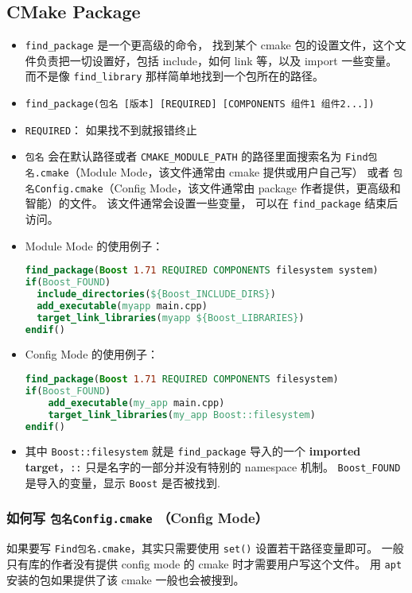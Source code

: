 \subsection{CMake Package}
\begin{itemize}
\item \verb`find_package` 是一个更高级的命令， 找到某个 cmake 包的设置文件，这个文件负责把一切设置好，包括 include，如何 link 等，以及 import 一些变量。 而不是像 \verb`find_library` 那样简单地找到一个包所在的路径。
\item \verb`find_package(包名 [版本] [REQUIRED] [COMPONENTS 组件1 组件2...])`
\item \verb`REQUIRED`： 如果找不到就报错终止
\item \verb`包名` 会在默认路径或者 \verb`CMAKE_MODULE_PATH` 的路径里面搜索名为 \verb`Find包名.cmake`（Module Mode，该文件通常由 cmake 提供或用户自己写） 或者 \verb`包名Config.cmake`（Config Mode，该文件通常由 package 作者提供，更高级和智能）的文件。 该文件通常会设置一些变量， 可以在 \verb`find_package` 结束后访问。
\item Module Mode 的使用例子：
\begin{lstlisting}[language=cmake]
find_package(Boost 1.71 REQUIRED COMPONENTS filesystem system)
if(Boost_FOUND)
  include_directories(${Boost_INCLUDE_DIRS})
  add_executable(myapp main.cpp)
  target_link_libraries(myapp ${Boost_LIBRARIES})
endif()
\end{lstlisting}
\item Config Mode 的使用例子：
\begin{lstlisting}[language=cmake]
find_package(Boost 1.71 REQUIRED COMPONENTS filesystem)
if(Boost_FOUND)
    add_executable(my_app main.cpp)
    target_link_libraries(my_app Boost::filesystem)
endif()
\end{lstlisting}
\item 其中 \verb`Boost::filesystem` 就是 \verb`find_package` 导入的一个 \textbf{imported target}，\verb`::` 只是名字的一部分并没有特别的 namespace 机制。 \verb`Boost_FOUND` 是导入的变量，显示 \verb`Boost` 是否被找到.
\end{itemize}

\subsubsection{如何写 \verb`包名Config.cmake` （Config Mode）}
如果要写 \verb`Find包名.cmake`，其实只需要使用 \verb`set()` 设置若干路径变量即可。 一般只有库的作者没有提供 config mode 的 cmake 时才需要用户写这个文件。 用 \verb`apt` 安装的包如果提供了该 cmake 一般也会被搜到。

